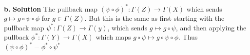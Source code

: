 \documentclass{article}
\begin{document}
\textbf{b. } \textbf{Solution } The pullback map $(\psi \circ \phi)^* : \Gamma(Z) \to \Gamma(X)$ which sends $g \mapsto g \circ \psi \circ \phi $ for $g \in \Gamma(Z)$. But this
is the same as first starting with the pullback map $\psi^* : \Gamma(Z) \to \Gamma(y)$, which sends $g \mapsto g \circ \psi$, and then applying the pullback $\phi^* : \Gamma(Y) \to \Gamma(X)$
which maps $g \circ \psi \mapsto g \circ \psi \circ \phi$. Thus $(\psi \circ \phi)^* = \phi^* \circ \psi^*$ 
\end{document}

